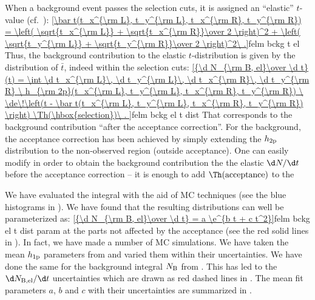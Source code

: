 When a background event passes the selection cuts, it is assigned an ``elastic'' $t$-value (cf.~):
\eqref{\bar t(t_x^{\rm L}, t_y^{\rm L}, t_x^{\rm R}, t_y^{\rm R})
= \left( \sqrt{t_x^{\rm L}} + \sqrt{t_x^{\rm R}}\over 2 \right)^2 + \left( \sqrt{t_y^{\rm L}} + \sqrt{t_y^{\rm R}}\over 2 \right)^2\ .}{felm bckg t el}
Thus, the background contribution to the elastic $t$-distribution is given by the distribution of $\bar t$, indeed within the selection cuts:
\eqref{{\d N_{\rm B, el}\over \d t}(t) = \int
	\d t_x^{\rm L}\, \d t_y^{\rm L}\, \d t_x^{\rm R}\, \d t_y^{\rm R}
	\ h_{\rm 2p}(t_x^{\rm L}, t_y^{\rm L}, t_x^{\rm R}, t_y^{\rm R})
	\ \de\!\left(t - \bar t(t_x^{\rm L}, t_y^{\rm L}, t_x^{\rm R}, t_y^{\rm R}) \right)
	\Th(\hbox{selection})\ .
}{felm bckg el t dist}
That corresponds to the background contribution ``after the acceptance correction''. For the background, the acceptance correction has been achieved by simply extending the $h_{\rm 2p}$ distribution to the non-observed region (outside acceptance). One can easily modify  in order to obtain the background contribution the the elastic $\d N/\d t$ before the acceptance correction -- it is enough to add $\Th(\hbox{acceptance})$ to the \rhs

We have evaluated the integral  with the aid of MC techniques (see the blue histograms in ). We have found that the resulting distributions can well be parameterized as:
\eqref{{\d N_{\rm B, el}\over \d t} = a \e^{b t + c t^2}}{felm bckg el t dist param}
at the parts not affected by the acceptance (see the red solid lines in ). In fact, we have made a number of MC simulations. We have taken the mean $h_{\rm 1p}$ parameters from  and varied them within their uncertainties. We have done the same for the background integral $N_{\rm B}$ from . This has led to the $\d N_{\rm B,el}/\d t$ uncertainties which are drawn as red dashed lines in . The mean fit parameters $a$, $b$ and $c$ with their uncertainties are summarized in .





